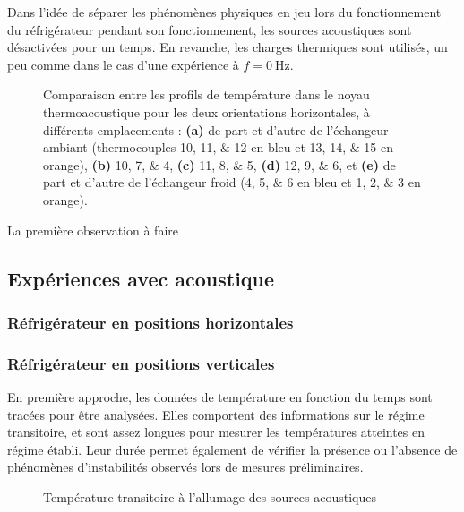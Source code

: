 Dans l'idée de séparer les phénomènes physiques en jeu lors du fonctionnement du réfrigérateur pendant son fonctionnement, les sources acoustiques sont désactivées pour un temps. En revanche, les charges thermiques sont utilisés, un peu comme dans le cas d'une expérience à $f=\qty{0}{\hertz}$. 

\begin{figure}[ht!]
    \centering
    
    \caption{Comparaison entre les profils de température dans le noyau thermoacoustique pour les deux orientations horizontales, à différents emplacements : \textbf{(a)} de part et d'autre de l'échangeur ambiant (thermocouples \numlist{10;11;12} en bleu et \numlist{13;14;15} en orange), \textbf{(b)} \numlist{10;7;4}, \textbf{(c)} \numlist{11;8;5}, \textbf{(d)} \numlist{12;9;6}, et \textbf{(e)} de part et d'autre de l'échangeur froid (\numlist{4;5;6} en bleu et \numlist{1;2;3} en orange).}
    \label{fig:ConvNat_HeatOnly}
\end{figure}

La première observation à faire 


\subsection{Expériences avec acoustique}

\subsubsection{Réfrigérateur en positions horizontales}

\subsubsection{Réfrigérateur en positions verticales}


En première approche, les données de température en fonction du temps sont tracées pour être analysées. Elles comportent des informations sur le régime transitoire, et sont assez longues pour mesurer les températures atteintes en régime établi. Leur durée permet également de vérifier la présence ou l'absence de phénomènes d'instabilités observés lors de mesures préliminaires.

\begin{figure}[!ht]
    \centering
    
    \caption{Température transitoire à l'allumage des sources acoustiques}
    \label{fig:Vert2_LowRix_Acou}
\end{figure}





